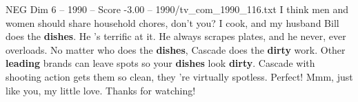 \begin{textsample}{NEG Dim 6 – 1990 – Score -3.00 – 1990/tv\_com\_1990\_116.txt}  \label{ex:f6_neg_021}
I think men and women should share household chores, don't you?
I cook, and my husband Bill does the \textbf{dishes}.
He 's terrific at it.
He always scrapes plates, and he never, ever overloads.
No matter who does the \textbf{dishes}, Cascade does the \textbf{dirty} work.
Other \textbf{leading} brands can leave spots so your \textbf{dishes} look \textbf{dirty}.
Cascade with shooting action gets them so clean, they 're virtually spotless.
Perfect!
Mmm, just like you, my little love.
Thanks for watching!

\end{textsample}
